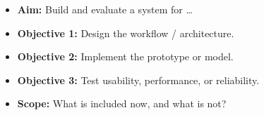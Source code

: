
\begin{itemize}
  \item \textbf{Aim:} Build and evaluate a system for \dots
  \item \textbf{Objective 1:} Design the workflow / architecture.
  \item \textbf{Objective 2:} Implement the prototype or model.
  \item \textbf{Objective 3:} Test usability, performance, or reliability.
  \item \textbf{Scope:} What is included now, and what is not?
\end{itemize}
